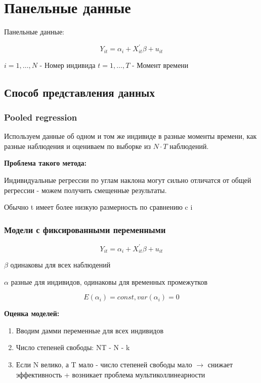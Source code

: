 \documentclass[a4paper, 12pt]{article}
\begin{document}
\section{Панельные данные}

Панельные данные:

\[Y_{it} = \alpha_i + X_{it}^{\prime} \beta + u_{it}\]

$i = 1, \ldots, N$ - Номер индивида
$t = 1, \ldots, T$ - Момент времени

\subsection{Способ представления данных}
\subsubsection{Pooled regression}

Используем данные об одном и том же индивиде в разные моменты времени,
как разные наблюдения и оцениваем по выборке из $N \cdot T$ наблюдений.

\textbf{Проблема такого метода:}

Индивидуальные регрессии по углам наклона могут сильно отличатся от общей регрессии
- можем получить смещенные результаты.

Обычно t имеет более низкую размерность по сравнению c i 

\subsubsection{Модели с фиксированными переменными}

\[Y_{it} = \alpha_i + X_{it}^{\prime}\beta + u_{it}\]

$\beta$ одинаковы для всех наблюдений

$\alpha$ разные для индивидов, одинаковы для временных промежутков

\[E(\alpha_i) = const, var(\alpha_i) = 0\]

\textbf{Оценка моделей:}

\begin{enumerate}
    \item Вводим дамми переменные для всех индивидов
    \item Число степеней свободы: NT - N - k
    \item Если N велико, а T мало - число степеней свободы мало 
    $\rightarrow$ снижает эффективность + возникает проблема мультиколлинеарности
\end{enumerate}
\end{document}
